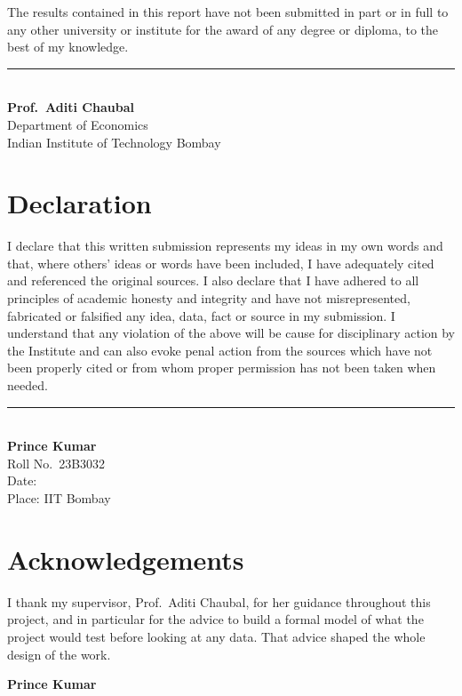 The results contained in this report have not been submitted in part or in full to any other university or institute
for the award of any degree or diploma, to the best of my knowledge.

\vspace{3cm}
\noindent\rule{6.5cm}{0.4pt}\\
\textbf{Prof.\ Aditi Chaubal}\\
Department of Economics\\
Indian Institute of Technology Bombay

\chapter*{Declaration}
\thispagestyle{plain}
I declare that this written submission represents my ideas in my own words and that, where others' ideas or words have
been included, I have adequately cited and referenced the original sources. I also declare that I have adhered to all
principles of academic honesty and integrity and have not misrepresented, fabricated or falsified any idea, data, fact
or source in my submission. I understand that any violation of the above will be cause for disciplinary action by the
Institute and can also evoke penal action from the sources which have not been properly cited or from whom proper
permission has not been taken when needed.

\vspace{3cm}
\noindent\rule{6.5cm}{0.4pt}\\
\textbf{Prince Kumar}\\
Roll No.\ 23B3032\\
Date:\\
Place: IIT Bombay

\chapter*{Acknowledgements}
\thispagestyle{plain}
I thank my supervisor, Prof.\ Aditi Chaubal, for her guidance throughout this project, and in particular for the
advice to build a formal model of what the project would test before looking at any data. That advice shaped the
whole design of the work.

\vspace{1.5cm}
\noindent\textbf{Prince Kumar}

